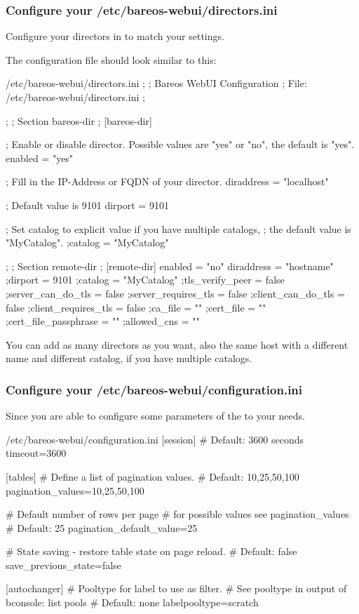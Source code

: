 \subsubsection{Configure your /etc/bareos-webui/directors.ini}
\label{sec:webui-configuration-files}

Configure your directors in  to match your settings.

The configuration file  should look similar to this:

\begin{bconfig}{/etc/bareos-webui/directors.ini}
;
; Bareos WebUI Configuration
; File: /etc/bareos-webui/directors.ini
;

;
; Section bareos-dir
;
[bareos-dir]

; Enable or disable director. Possible values are "yes" or "no", the default is "yes".
enabled = "yes"

; Fill in the IP-Address or FQDN of your director.
diraddress = "localhost"

; Default value is 9101
dirport = 9101

; Set catalog to explicit value if you have multiple catalogs,
; the default value is "MyCatalog".
;catalog = "MyCatalog"

;
; Section remote-dir
;
[remote-dir]
enabled = "no"
diraddress = "hostname"
;dirport = 9101
;catalog = "MyCatalog"
;tls_verify_peer = false
;server_can_do_tls = false
;server_requires_tls = false
;client_can_do_tls = false
;client_requires_tls = false
;ca_file = ""
;cert_file = ""
;cert_file_passphrase = ""
;allowed_cns = ""
\end{bconfig}

You can add as many directors as you want, also the same host with a different name and different catalog, if you have multiple catalogs.

\subsubsection{Configure your /etc/bareos-webui/configuration.ini}

Since 
you are able to configure some parameters of the \bareosWebui to your needs.

\begin{bconfig}{/etc/bareos-webui/configuration.ini}
[session]
# Default: 3600 seconds
timeout=3600

[tables]
# Define a list of pagination values.
# Default: 10,25,50,100
pagination_values=10,25,50,100

# Default number of rows per page
# for possible values see pagination_values
# Default: 25
pagination_default_value=25

# State saving - restore table state on page reload.
# Default: false
save_previous_state=false

[autochanger]
# Pooltype for label to use as filter.
# See pooltype in output of bconsole: list pools
# Default: none
labelpooltype=scratch
\end{bconfig}

